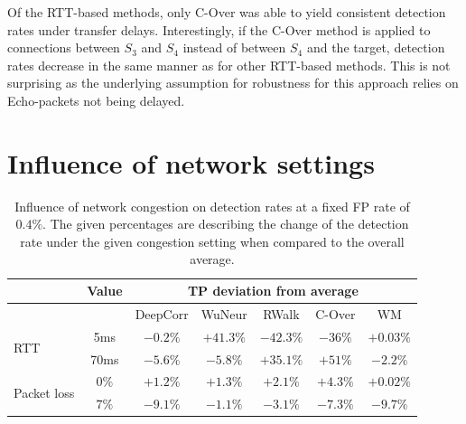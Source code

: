 \documentclass[runningheads,11pt]{llncs}\usepackage[]{graphicx}\usepackage[]{color}
\begin{document}

Of the RTT-based methods, only C-Over was able to yield consistent detection rates under transfer delays. 
Interestingly, if the C-Over method is applied to connections between $S_3$ and $S_4$ instead of between $S_4$ and the target, detection rates decrease in the same manner as for other RTT-based methods. This is not surprising as the underlying assumption for robustness for this approach relies on Echo-packets not being delayed.


\section{Influence of network settings}\label{Sec:InfluenceNetwork}

\begin{table}
\centering
\begin{tabular}{l|c|c|c|c|c|c}
& Value & \multicolumn{5}{c}{TP deviation from average}\\ \hline
 & &DeepCorr & WuNeur & RWalk& C-Over & WM \\ \hline
\multirow{2}{*}{RTT} & 5ms& $-0.2\%$ & $+41.3\%$& $-42.3\%$ & $-36\%$ & $+0.03\%$ \\ \cline{2-7}
 & 70ms & $-5.6\%$ & $-5.8\%$& $+35.1\%$ & $+51\%$& $-2.2\%$\\ \hline

\multirow{2}{*}{Packet loss} & $0\%$ & $+1.2\%$& $+1.3\%$ & $+2.1\%$ & $+4.3\%$ & $+0.02\%$\\ \cline{2-7}
 & $7\%$ & $-9.1\%$& $-1.1\%$ & $-3.1\%$ & $-7.3\%$ & $-9.7\%$\\ \hline %



\end{tabular}
\caption{Influence of network congestion on detection rates at a fixed FP rate of $0.4\%$. The given percentages are describing the change of the detection rate under the given congestion setting when compared to the overall average.}\label{Tab:Congestion}
\end{table}
\end{document}
